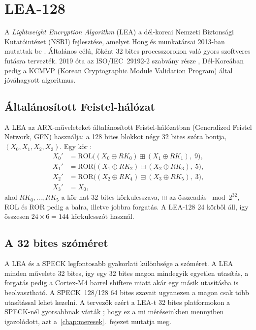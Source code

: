 \documentclass[a4paper,12pt]{report}
\theoremstyle{definition}
\theoremstyle{remark}
\begin{document}
\section{LEA-128}\label{sec:lea}

A \emph{Lightweight Encryption Algorithm} (LEA) a dél-koreai Nemzeti Biztonsági Kutatóintézet (NSRI) fejlesztése, amelyet Hong és munkatársai 2013-ban mutattak be \cite{Hong2013}. Általános célú, főként 32 bites processzorokon való gyors szoftveres futásra tervezték. 2019 óta az ISO/IEC~29192-2 szabvány része \cite{ISO29192}, Dél-Koreában pedig a KCMVP (Korean Cryptographic Module Validation Program) által jóváhagyott algoritmus.

\subsection{Általánosított Feistel-hálózat}\label{sec:lea_kor}

A LEA az ARX-műveleteket általánosított Feistel-hálózatban (Generalized Feistel Network, GFN) használja: a 128 bites blokkot négy 32 bites szóra bontja, $(X_0, X_1, X_2, X_3)$. Egy kör \cite{Hong2013}:
\begin{align}
X_0' &= \text{ROL}\big((X_0 \oplus RK_0) \mathbin{\boxplus} (X_1 \oplus RK_1),\; 9\big), \\
X_1' &= \text{ROR}\big((X_1 \oplus RK_2) \mathbin{\boxplus} (X_2 \oplus RK_3),\; 5\big), \\
X_2' &= \text{ROR}\big((X_2 \oplus RK_4) \mathbin{\boxplus} (X_3 \oplus RK_5),\; 3\big), \\
X_3' &= X_0,
\end{align}
ahol $RK_0, \ldots, RK_5$ a kör hat 32 bites körkulcsszava, $\boxplus$ az összeadás $\bmod 2^{32}$, ROL és ROR pedig a balra, illetve jobbra forgatás. A LEA-128 24 körből áll, így összesen $24 \times 6 = 144$ körkulcsszót használ.

\subsection{A 32 bites szóméret}

A LEA és a SPECK legfontosabb gyakorlati különbsége a szóméret. A LEA minden művelete 32 bites, így egy 32 bites magon mindegyik egyetlen utasítás, a forgatás pedig a Cortex-M4 barrel shiftere miatt akár egy másik utasításba is beolvasztható. A SPECK~128/128 64 bites szavait ugyanezen a magon csak több utasítással lehet kezelni. A tervezők ezért a LEA-t 32 bites platformokon a SPECK-nél gyorsabbnak várták \cite{Hong2013}; hogy ez a mi méréseinkben mennyiben igazolódott, azt a~\ref{chap:meresek}.~fejezet mutatja meg.
\end{document}
